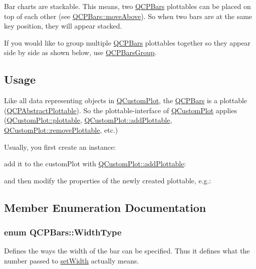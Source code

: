 Bar charts are stackable. This means, two \hyperlink{class_q_c_p_bars}{Q\+C\+P\+Bars} plottables can be placed on top of each other (see \hyperlink{class_q_c_p_bars_ac22e00a6a41509538c21b04f0a57318c}{Q\+C\+P\+Bars\+::move\+Above}). So when two bars are at the same key position, they will appear stacked.

If you would like to group multiple \hyperlink{class_q_c_p_bars}{Q\+C\+P\+Bars} plottables together so they appear side by side as shown below, use \hyperlink{class_q_c_p_bars_group}{Q\+C\+P\+Bars\+Group}.

\hypertarget{class_q_c_p_statistical_box_usage}{}\subsection{Usage}\label{class_q_c_p_statistical_box_usage}
Like all data representing objects in \hyperlink{class_q_custom_plot}{Q\+Custom\+Plot}, the \hyperlink{class_q_c_p_bars}{Q\+C\+P\+Bars} is a plottable (\hyperlink{class_q_c_p_abstract_plottable}{Q\+C\+P\+Abstract\+Plottable}). So the plottable-\/interface of \hyperlink{class_q_custom_plot}{Q\+Custom\+Plot} applies (\hyperlink{class_q_custom_plot_a32de81ff53e263e785b83b52ecd99d6f}{Q\+Custom\+Plot\+::plottable}, \hyperlink{class_q_custom_plot_ab7ad9174f701f9c6f64e378df77927a6}{Q\+Custom\+Plot\+::add\+Plottable}, \hyperlink{class_q_custom_plot_af3dafd56884208474f311d6226513ab2}{Q\+Custom\+Plot\+::remove\+Plottable}, etc.)

Usually, you first create an instance\+: 
\begin{DoxyCodeInclude}
\end{DoxyCodeInclude}
add it to the custom\+Plot with \hyperlink{class_q_custom_plot_ab7ad9174f701f9c6f64e378df77927a6}{Q\+Custom\+Plot\+::add\+Plottable}\+: 
\begin{DoxyCodeInclude}
\end{DoxyCodeInclude}
and then modify the properties of the newly created plottable, e.\+g.\+: 
\begin{DoxyCodeInclude}
\end{DoxyCodeInclude}


\subsection{Member Enumeration Documentation}
\subsubsection[{\texorpdfstring{Width\+Type}{WidthType}}]{\setlength{\rightskip}{0pt plus 5cm}enum {\bf Q\+C\+P\+Bars\+::\+Width\+Type}}\hypertarget{class_q_c_p_bars_a65dbbf1ab41cbe993d71521096ed4649}{}\label{class_q_c_p_bars_a65dbbf1ab41cbe993d71521096ed4649}
Defines the ways the width of the bar can be specified. Thus it defines what the number passed to \hyperlink{class_q_c_p_bars_afec6116579d44d5b706e0fa5e5332507}{set\+Width} actually means.

